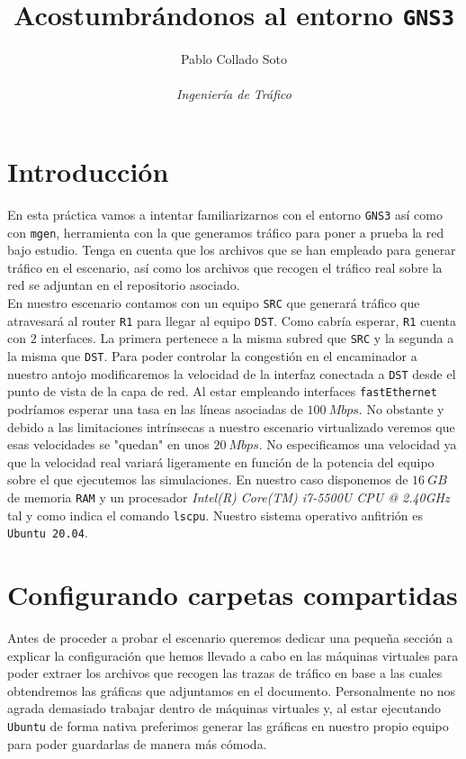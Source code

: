 \documentclass[11pt]{article}
\title{Acostumbrándonos al entorno \texttt{GNS3}}
\author{Pablo Collado Soto \\ \\ \textit{Ingeniería de Tráfico}}
\date{}
\begin{document}
    \maketitle

    \section{Introducción}
        En esta práctica vamos a intentar familiarizarnos con el entorno \texttt{GNS3} así como con \texttt{mgen}, herramienta con la que generamos tráfico para poner a prueba la red bajo estudio. Tenga en cuenta que los archivos que se han empleado para generar tráfico en el escenario, así como los archivos que recogen el tráfico real sobre la red se adjuntan en el repositorio asociado.\\

        En nuestro escenario contamos con un equipo \texttt{SRC} que generará tráfico que atravesará al router \texttt{R1} para llegar al equipo \texttt{DST}. Como cabría esperar, \texttt{R1} cuenta con $2$ interfaces. La primera pertenece a la misma subred que \texttt{SRC} y la segunda a la misma que \texttt{DST}. Para poder controlar la congestión en el encaminador a nuestro antojo modificaremos la velocidad de la interfaz conectada a \texttt{DST} desde el punto de vista de la capa de red. Al estar empleando interfaces \texttt{fastEthernet} podríamos esperar una tasa en las líneas asociadas de $100\ Mbps$. No obstante y debido a las limitaciones intrínsecas a nuestro escenario virtualizado veremos que esas velocidades se "quedan" en unos $20\ Mbps$. No especificamos una velocidad ya que la velocidad real variará ligeramente en función de la potencia del equipo sobre el que ejecutemos las simulaciones. En nuestro caso disponemos de $16\ GB$ de memoria \texttt{RAM} y un procesador \textit{Intel(R) Core(TM) i7-5500U CPU @ 2.40GHz} tal y como indica el comando \texttt{lscpu}. Nuestro sistema operativo anfitrión es \texttt{Ubuntu 20.04}.

        \section{Configurando carpetas compartidas}
            Antes de proceder a probar el escenario queremos dedicar una pequeña sección a explicar la configuración que hemos llevado a cabo en las máquinas virtuales para poder extraer los archivos que recogen las trazas de tráfico en base a las cuales obtendremos las gráficas que adjuntamos en el documento. Personalmente no nos agrada demasiado trabajar dentro de máquinas virtuales y, al estar ejecutando \texttt{Ubuntu} de forma nativa preferimos generar las gráficas en nuestro propio equipo para poder guardarlas de manera más cómoda.\\
\end{document}
